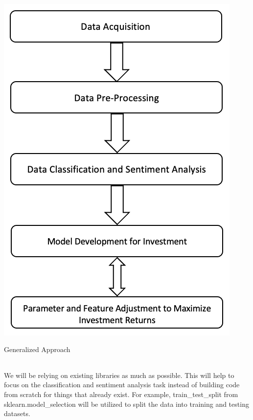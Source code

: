 \documentclass[twocolumn,10pt]{article}
\makeatletter
\newenvironment{figurehere}
  {\def\@captype{figure}}
  {}
\makeatother
\begin{document}
\begin{multicols}{2}
\begin{flushleft}
	\begin{figurehere}
		\centering
		\includegraphics[width=0.65\linewidth]{images/gen_approach.png}
		\caption{Generalized Approach}
		\label{fig:gen_approach}
	\end{figurehere}
	
	\mbox{}\\
	We will be relying on existing libraries as much as possible. This will help to focus on the classification and sentiment analysis task instead of building code from scratch for things that already exist. For example, train\_test\_split from sklearn.model\_selection \cite{scdatasplit} will be utilized to split the data into training and testing datasets.
		

\end{flushleft}
\end{multicols}
\end{document}
